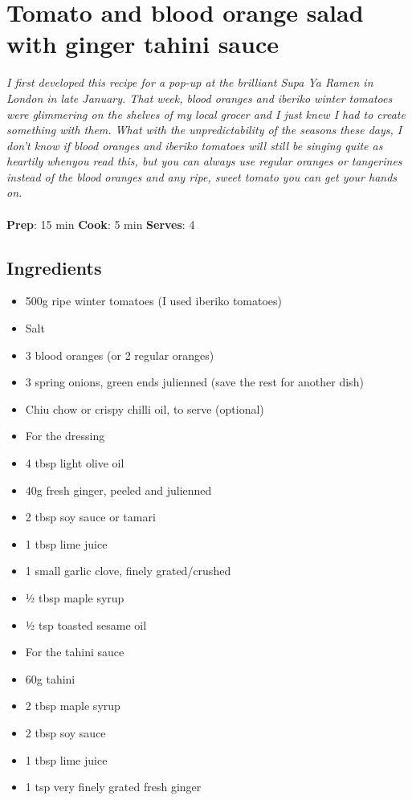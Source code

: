 \section{Tomato and blood orange salad with ginger tahini sauce}
\emph{I first developed this recipe for a pop-up at the brilliant Supa Ya Ramen in London in late January. That week, blood oranges and iberiko winter tomatoes were glimmering on the shelves of my local grocer and I just knew I had to create something with them. What with the unpredictability of the seasons these days, I don’t know if blood oranges and iberiko tomatoes will still be singing quite as heartily whenyou read this, but you can always use regular oranges or tangerines instead of the blood oranges and any ripe, sweet tomato you can get your hands on.}\\\\ 
\textbf{Prep}: 15 min
\textbf{Cook}: 5 min
\textbf{Serves}: 4
\subsection*{Ingredients}
\begin{itemize}
\item 500g ripe winter tomatoes (I used iberiko tomatoes)
\item Salt
\item 3 blood oranges (or 2 regular oranges)
\item 3 spring onions, green ends julienned (save the rest for another dish)
\item Chiu chow or crispy chilli oil, to serve (optional)
\end{itemize}

\begin{itemize}
\item For the dressing
\item 4 tbsp light olive oil
\item 40g fresh ginger, peeled and julienned
\item 2 tbsp soy sauce or tamari 
\item 1 tbsp lime juice
\item 1 small garlic clove, finely grated/crushed
\item ½ tbsp maple syrup
\item ½ tsp toasted sesame oil
\end{itemize}

\begin{itemize}
\item For the tahini sauce
\item 60g tahini 
\item 2 tbsp maple syrup
\item 2 tbsp soy sauce
\item 1 tbsp lime juice
\item 1 tsp very finely grated fresh ginger
\end{itemize}

